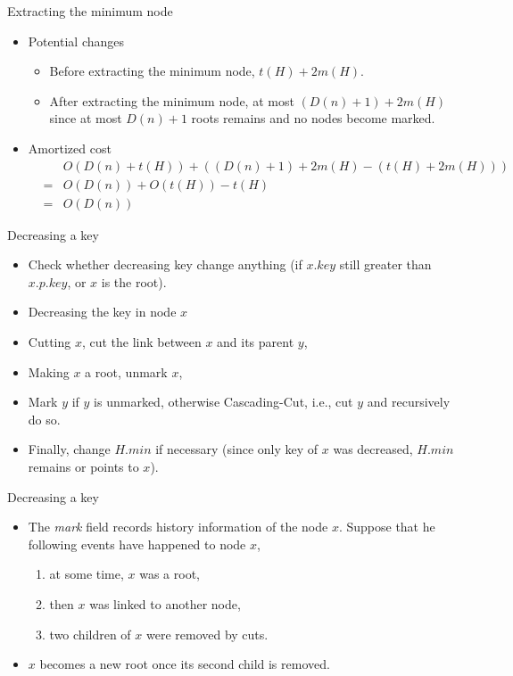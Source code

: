 \documentclass{beamer}
\begin{document}
\begin{frame}{Extracting the minimum node}
\begin{itemize}
\item Potential changes
\begin{itemize}
\item Before extracting the minimum node, $t(H)+2m(H)$.
\item After extracting the minimum node, at most $(D(n)+1)+2m(H)$ since at most $D(n)+1$ roots remains
and no nodes become marked. 
\end{itemize}
\item Amortized cost
\begin{eqnarray}
 & & O(D(n)+t(H)) + ((D(n)+1)+2m(H)-(t(H)+2m(H))) \nonumber \\
 &=& O(D(n)) + O(t(H)) -t(H) \nonumber \\
 &=& O(D(n)) \nonumber
\end{eqnarray}
\end{itemize}
\end{frame}

\begin{frame}{Decreasing a key}

\vspace{0.5cm}
\begin{itemize}
\item Check whether decreasing key change anything (if $x.key$ still greater than $x.p.key$, or $x$ is the root). 
\item Decreasing the key in node $x$
\item Cutting $x$, cut the link between $x$ and its parent $y$,
\item Making $x$ a root, unmark $x$,
\item Mark $y$ if $y$ is unmarked, otherwise {\sc Cascading-Cut}, i.e., cut $y$ and recursively do so. 
\item Finally, change $H.min$ if necessary (since only key of $x$ was decreased, $H.min$ remains or points to $x$). 
\end{itemize}
\end{frame}

\begin{frame}{Decreasing a key}

\begin{itemize}
\item The {\it mark} field records history information of the node $x$. Suppose that he following events have happened to node $x$,
\begin{enumerate}
\item at some time, $x$ was a root,
\item then $x$ was linked to another node,
\item  two children of $x$ were removed by cuts. 
\end{enumerate}
\item $x$ becomes a new root once its second child is removed. 
\end{itemize}
\end{frame}
\end{document}
